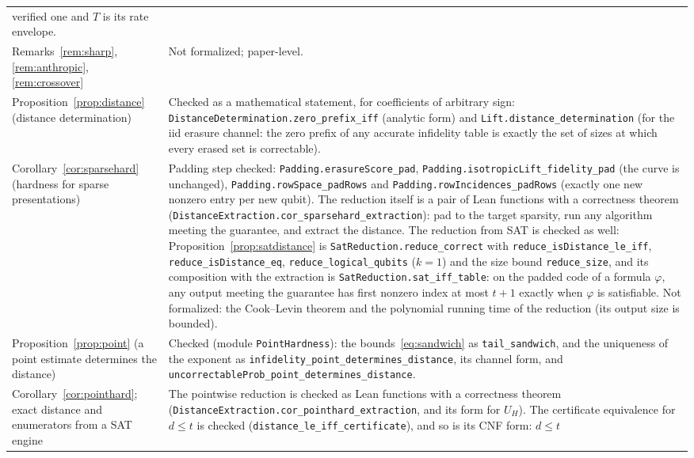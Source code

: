 \documentclass[11pt]{article}
\theoremstyle{remark}
\newcommand{\lean}[1]{\texttt{#1}}
\begin{document}
{\begin{longtable}{@{}p{}p{}@{}}
verified one and \(T\) is its rate envelope.\\
Remarks~\ref{rem:sharp}, \ref{rem:anthropic}, \ref{rem:crossover} &
Not formalized; paper-level.\\
Proposition~\ref{prop:distance} (distance determination) &
Checked as a mathematical statement, for coefficients of arbitrary
sign: \lean{DistanceDetermination.zero\_prefix\_iff} (analytic form) and
\lean{Lift.distance\_determination} (for the iid erasure channel: the
zero prefix of any accurate infidelity table is exactly the set of
sizes at which every erased set is correctable).\\
Corollary~\ref{cor:sparsehard} (hardness for sparse presentations) &
Padding step checked: \lean{Padding.erasureScore\_pad},
\lean{Padding.isotropicLift\_fidelity\_pad} (the curve is unchanged),
\lean{Padding.rowSpace\_padRows} and
\lean{Padding.rowIncidences\_padRows} (exactly one new nonzero entry per
new qubit). The reduction itself is a pair of Lean functions with a
correctness theorem (\lean{DistanceExtraction.cor\_sparsehard\_extraction}):
pad to the target sparsity, run any algorithm meeting the guarantee,
and extract the distance. The reduction from SAT is checked as well:
Proposition~\ref{prop:satdistance} is \lean{SatReduction.reduce\_correct}
with \lean{reduce\_isDistance\_le\_iff}, \lean{reduce\_isDistance\_eq},
\lean{reduce\_logical\_qubits} (\(k=1\)) and the size bound
\lean{reduce\_size}, and its composition with the extraction is
\lean{SatReduction.sat\_iff\_table}: on the padded code of a formula
\(\varphi\), any output meeting the guarantee has first nonzero index at
most \(t+1\) exactly when \(\varphi\) is satisfiable. Not formalized:
the Cook--Levin theorem and the polynomial running time of the
reduction (its output size is bounded).\\
Proposition~\ref{prop:point} (a point estimate determines the distance) &
Checked (module \lean{PointHardness}): the bounds~\eqref{eq:sandwich} as
\lean{tail\_sandwich}, and the uniqueness of the exponent as
\lean{infidelity\_point\_determines\_distance}, its channel form, and
\lean{uncorrectableProb\_point\_determines\_distance}.\\
Corollary~\ref{cor:pointhard}; exact distance and enumerators from a SAT
engine &
The pointwise reduction is checked as Lean functions with a correctness
theorem (\lean{DistanceExtraction.cor\_pointhard\_extraction}, and its
form for \(U_H\)). The certificate equivalence for \(d\le t\) is checked
(\lean{distance\_le\_iff\_certificate}), and so is its CNF form: \(d\le t\)

\end{longtable}}
\end{document}
